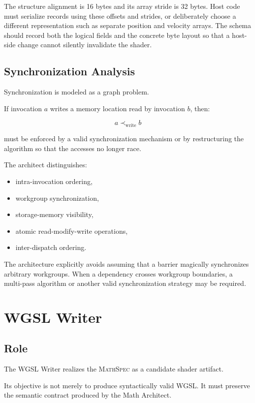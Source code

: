 \documentclass[11pt,a4paper,oneside]{report}
\newcommand{\MathSpec}{\textsc{MathSpec}}
\begin{document}
The structure alignment is 16 bytes and its array stride is 32 bytes. Host code must serialize
records using these offsets and strides, or deliberately choose a different representation such
as separate position and velocity arrays. The schema should record both the logical fields and
the concrete byte layout so that a host-side change cannot silently invalidate the shader.

\section{Synchronization Analysis}

Synchronization is modeled as a graph problem.

If invocation $a$ writes a memory location read by invocation $b$, then:

\[
a \prec_{\mathrm{write}} b
\]

must be enforced by a valid synchronization mechanism or by restructuring the algorithm so that
the accesses no longer race.

The architect distinguishes:

\begin{itemize}
  \item intra-invocation ordering,
  \item workgroup synchronization,
  \item storage-memory visibility,
  \item atomic read-modify-write operations,
  \item inter-dispatch ordering.
\end{itemize}

The architecture explicitly avoids assuming that a barrier magically synchronizes arbitrary
workgroups. When a dependency crosses workgroup boundaries, a multi-pass algorithm or another
valid synchronization strategy may be required.

\chapter{WGSL Writer}

\section{Role}

The WGSL Writer realizes the \MathSpec{} as a candidate shader artifact.

Its objective is not merely to produce syntactically valid WGSL. It must preserve the semantic
contract produced by the Math Architect.
\end{document}
